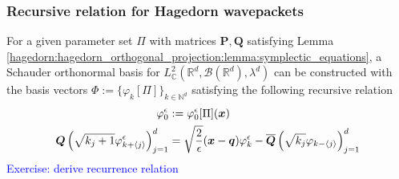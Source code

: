 \documentclass[12pt]{article}
\numberwithin{equation}{section}
\begin{document}
        \subsubsection{Recursive relation for Hagedorn wavepackets}
        For a given parameter set $\Pi$ with matrices 
        $\bm{P}, \bm{Q}$ satisfying Lemma 
        \ref{hagedorn:hagedorn_orthogonal_projection:lemma:symplectic_equations},
        a Schauder orthonormal  
        basis 
        for 
        $L^2_{\mathbb{C}} (\mathbb{R}^d, \mathcal{B}(\mathbb{R}^d), \lambda^d)$ 
        can be constructed with the basis vectors 
        $\Phi := \{\varphi_k[\Pi]\}_{k \in \mathbb{N}^d}$ 
        satisfying the following recursive relation 
        \begin{align}
          \varphi_0^{\epsilon} &:= \varphi_0^\epsilon[\Pi](\bm{x})
          \notag
          \\
          \bm{Q} \left(\sqrt{k_j + 1 } \varphi^\epsilon_{k + \langle j \rangle} \right)_{j=1}^d&=
          \sqrt{\frac{2}{\epsilon}} (\bm{x} - \bm{q}) \varphi_k^\epsilon -
          \overline{\bm{Q}}
          \left(\sqrt{k_j} \varphi_{k - \langle j \rangle } \right)_{j=1}^d
          \label{hagedorn:hagedorn_wavepackets:recursive_relation}
        \end{align}
        \textcolor{blue}{Exercise: derive recurrence relation}
      
      \newpage
       
      \newpage

      
        
\end{document}
